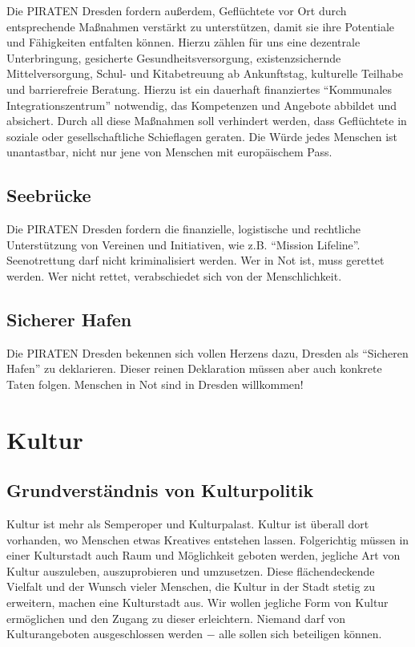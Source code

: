 \documentclass[a4paper, 11pt]{article}
\begin{document}
Die PIRATEN Dresden fordern außerdem, Geflüchtete vor Ort durch entsprechende Maßnahmen verstärkt zu unterstützen, damit sie ihre Potentiale und Fähigkeiten entfalten können. Hierzu zählen für uns eine dezentrale Unterbringung, gesicherte Gesundheitsversorgung, existenzsichernde Mittelversorgung, Schul- und Kitabetreuung ab Ankunftstag, kulturelle Teilhabe und barrierefreie Beratung. Hierzu ist ein dauerhaft finanziertes ``Kommunales Integrationszentrum'' notwendig, das Kompetenzen und Angebote abbildet und absichert. Durch all diese Maßnahmen soll verhindert werden, dass Geflüchtete in soziale oder gesellschaftliche Schieflagen geraten. Die Würde jedes Menschen ist unantastbar, nicht nur jene von Menschen mit europäischem Pass.








\subsection{Seebrücke}
Die PIRATEN Dresden fordern die finanzielle, logistische und rechtliche Unterstützung von Vereinen und Initiativen, wie z.B. ``Mission Lifeline''. Seenotrettung darf nicht kriminalisiert werden. Wer in Not ist, muss gerettet werden. Wer nicht rettet, verabschiedet sich von der Menschlichkeit.


\subsection{Sicherer Hafen}
Die PIRATEN Dresden bekennen sich vollen Herzens dazu, Dresden als ``Sicheren Hafen'' zu deklarieren. Dieser reinen Deklaration müssen aber auch konkrete Taten folgen. Menschen in Not sind in Dresden willkommen!


\section{Kultur}

\subsection{Grundverständnis von Kulturpolitik}
Kultur ist mehr als Semperoper und Kulturpalast. Kultur ist überall dort vorhanden, wo Menschen etwas Kreatives entstehen lassen. Folgerichtig müssen in einer Kulturstadt auch Raum und Möglichkeit geboten werden, jegliche Art von Kultur auszuleben, auszuprobieren und umzusetzen. Diese flächendeckende Vielfalt und der Wunsch vieler Menschen, die Kultur in der Stadt stetig zu erweitern, machen eine Kulturstadt aus. Wir wollen jegliche Form von Kultur ermöglichen und den Zugang zu dieser erleichtern. Niemand darf von Kulturangeboten ausgeschlossen werden $-$ alle sollen sich beteiligen können.
\end{document}
